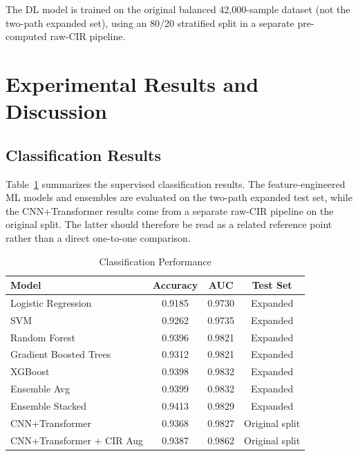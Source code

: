 \documentclass[conference]{IEEEtran}
\begin{document}
The DL model is trained on the original balanced 42,000-sample dataset (not the two-path expanded set), using an 80/20 stratified split in a separate pre-computed raw-CIR pipeline.

\section{Experimental Results and Discussion}

\subsection{Classification Results}

Table~\ref{tab:cls_results} summarizes the supervised classification results. The feature-engineered ML models and ensembles are evaluated on the two-path expanded test set, while the CNN+Transformer results come from a separate raw-CIR pipeline on the original split. The latter should therefore be read as a related reference point rather than a direct one-to-one comparison.

\begin{table}[t]
\caption{Classification Performance}
\label{tab:cls_results}
\centering
\begin{tabular}{@{}lccc@{}}
\toprule
\textbf{Model} & \textbf{Accuracy} & \textbf{AUC} & \textbf{Test Set} \\
\midrule
Logistic Regression & 0.9185 & 0.9730 & Expanded \\
SVM & 0.9262 & 0.9735 & Expanded \\
Random Forest & 0.9396 & 0.9821 & Expanded \\
Gradient Boosted Trees & 0.9312 & 0.9821 & Expanded \\
XGBoost & 0.9398 & 0.9832 & Expanded \\
Ensemble Avg & 0.9399 & 0.9832 & Expanded \\
Ensemble Stacked & 0.9413 & 0.9829 & Expanded \\
CNN+Transformer & 0.9368 & 0.9827 & Original split \\
CNN+Transformer + CIR Aug & 0.9387 & 0.9862 & Original split \\
\bottomrule
\end{tabular}
\end{table}
\end{document}
